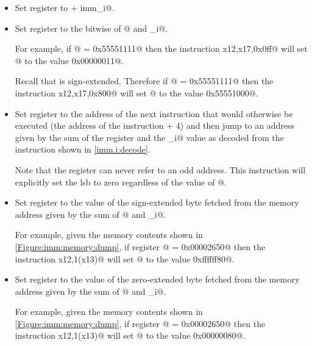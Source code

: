 \begin{itemize}
\item{}
\label{insn:addi}

Set register \verb@rd@ to  + imm_i@.

\item{}
\label{insn:andi}

Set register \verb@rd@ to the bitwise \verb@and@ of @ and \verb@imm_i@.

For example, if @ = \verb@0x55551111@ then the instruction 
\verb@andi x12,x17,0x0ff@ will set @ to the value \verb@0x00000011@.

Recall that \verb@imm@ is sign-extended.  
Therefore if @ = \verb@0x55551111@ then the instruction 
\verb@andi x12,x17,0x800@ will set @ to the value \verb@0x55551000@.

\item{}
\label{insn:jalr}

Set register \verb@rd@ to the address of the next instruction that would 
otherwise be executed (the address of the \verb@jalr@ instruction + 4) and then 
jump to an address given by the sum of the \verb@pc@ register and the 
\verb@imm_i@ value as decoded from the instruction shown in \autoref{imm.i:decode}.

Note that the \verb@pc@ register can never refer to an odd address.  
This instruction will explicitly set the \acrshort{lsb} to zero regardless
of the value of @.

\item{}
\label{insn:lb}

Set register \verb@rd@ to the value of the sign-extended byte fetched from 
the memory address given by the sum of @ and \verb@imm_i@.

For example, given the memory contents shown in \autoref{Figure:imm:memory:dump},
if register @ = \verb@0x00002650@ then the instruction
\verb@lb x12,1(x13)@ will set @ to the value \verb@0xffffff80@.

\item{}
\label{insn:lbu}

Set register \verb@rd@ to the value of the zero-extended byte fetched from 
the memory address given by the sum of @ and \verb@imm_i@.

For example, given the memory contents shown in \autoref{Figure:imm:memory:dump},
if register @ = \verb@0x00002650@ then the instruction
\verb@lb x12,1(x13)@ will set @ to the value \verb@0x00000080@.


\end{itemize}
